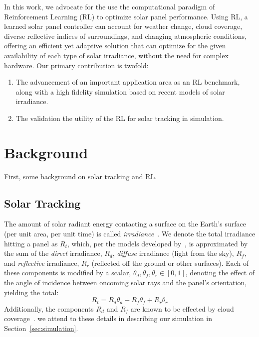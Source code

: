 \documentclass{article}
\begin{document}
In this work, we advocate for the use the computational paradigm of Reinforcement Learning (RL) to optimize solar panel performance. Using RL, a learned solar panel controller can account for weather change, cloud coverage, diverse reflective indices of surroundings, and changing atmospheric conditions, offering an efficient yet adaptive solution that can optimize for the given availability of each type of solar irradiance, without the need for complex hardware. Our primary contribution is twofold:
\begin{enumerate}
\item The advancement of an important application area as an RL benchmark, along with a high fidelity simulation based on recent models of solar irradiance.
\item The validation the utility of the RL for solar tracking in simulation.
\end{enumerate}

\section{Background}


First, some background on solar tracking and RL.

\subsection{Solar Tracking}
The amount of solar radiant energy contacting a surface on the Earth's surface (per unit area, per unit time) is called {\it irradiance}~\cite{goswami2000principles}.  We denote the total irradiance hitting a panel as $R_t$, which, per the models developed by~\citet{kamali2006estimating}, is approximated by the sum of the {\it direct} irradiance, $R_d$, {\it diffuse} irradiance (light from the sky), $R_f$, and {\it reflective} irradiance, $R_r$ (reflected off the ground or other surfaces). Each of these components is modified by a scalar, $\theta_d, \theta_f, \theta_r \in [0,1]$, denoting the effect of the angle of incidence between oncoming solar rays and the panel's orientation, yielding the total:
\begin{equation}
R_t = R_d \theta_d + R_f \theta_f + R_r \theta_r
\label{eq:total_rads}
\end{equation}
Additionally, the components $R_d$ and $R_f$ are known to be effected by cloud coverage~\cite{li2004overcast,pfister2003cloud,tzoumanikas2016effect}.  we attend to these details in describing our simulation in Section~\ref{sec:simulation}.
\end{document}
